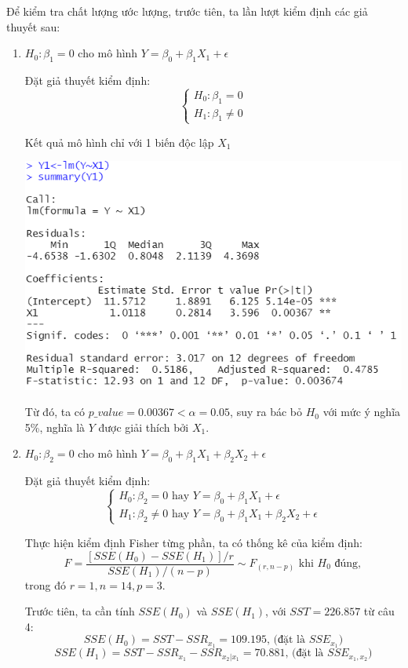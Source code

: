 \documentclass[a4paper]{article}
\theoremstyle{nonumberplain}
\begin{document}
Để kiểm tra chất lượng ước lượng, trước tiên, ta lần lượt kiểm định các giả thuyết sau:
\begin{enumerate}[label=(\roman*)]
	\item $H_0: \beta_1 = 0$ cho mô hình $Y = \beta_0 + \beta_1X_1 + \epsilon$
	
	Đặt giả thuyết kiểm định:
	\[\begin{cases}
		H_0 : \beta_1 = 0\\
		H_1 : \beta_1 \ne 0
	\end{cases}\]

	Kết quả mô hình chỉ với 1 biến độc lập $X_1$
	\begin{center}
		\includegraphics{bai3_10.PNG} 
	\end{center}
	
	Từ đó, ta có $p\_value = 0.00367 < \alpha = 0.05$, suy ra bác bỏ $H_0$ với mức ý nghĩa 5\%, nghĩa là $Y$ được giải thích bởi $X_1$.
	
	\item $H_0: \beta_2 = 0$ cho mô hình $Y = \beta_0 + \beta_1X_1 + \beta_2X_2 + \epsilon$
	
	Đặt giả thuyết kiểm định:
	\[\begin{cases}
		H_0 : \beta_2 = 0 \text{ hay } Y = \beta_0 + \beta_1 X_1 + \epsilon \\
		H_1 : \beta_2 \ne 0 \text{ hay } Y = \beta_0 + \beta_1 X_1 + \beta_2 X_2 + \epsilon
	\end{cases}\]
	
	Thực hiện kiểm định Fisher từng phần, ta có thống kê của kiểm định: 
	$$F = \displaystyle \frac{\left [ SSE (H_0) - SSE(H_1) \right ] / r}{SSE(H_1)/(n-p)} \sim F_{(r,n-p)} \text{ khi } H_0 \text{ đúng},$$
	trong đó $r = 1, n = 14, p = 3$.
	
	Trước tiên, ta cần tính $SSE (H_0)$ và $SSE(H_1)$, với $SST = 226.857$ từ câu 4:
	$$SSE(H_0) = SST - SSR_{x_1} = 109.195 \text{, (đặt là } SSE_{x_1})$$
	$$SSE(H_1) = SST - SSR_{x_1} - SSR_{x_2|x_1} = 70.881 \text{, (đặt là }  SSE_{x_1,x_2})$$
	

\end{enumerate}
\end{document}
